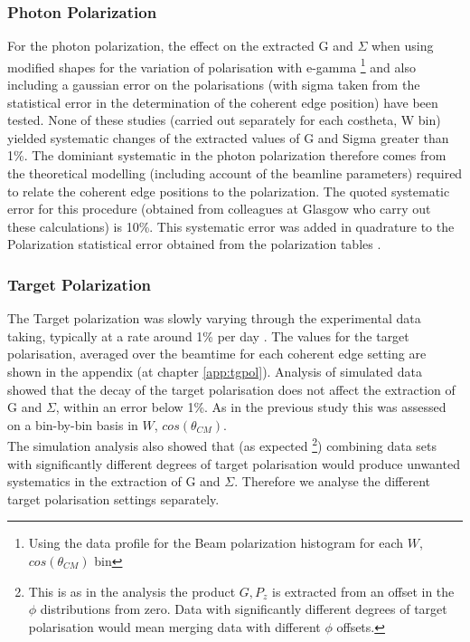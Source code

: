 \subsubsection{Photon Polarization}\label{sec:ph_pol_sys}
For the photon polarization, the effect on the extracted G and $\Sigma$ when using modified shapes for the variation of polarisation with e-gamma \footnote{Using the data profile for the Beam polarization histogram for each $W$, $cos(\theta_{CM})$ bin} and also including a gaussian error on the polarisations (with sigma taken from the statistical error in the determination of the coherent edge position) have been tested. None of these studies (carried out separately for each costheta, W bin) yielded systematic changes of the extracted values of G and Sigma greater than 1\%. The dominiant systematic in the photon polarization therefore comes from the theoretical modelling (including account of the beamline parameters) required to relate the coherent edge positions to the polarization. The quoted systematic error for this procedure (obtained from colleagues at Glasgow who carry out these calculations) is 10\%.
 This systematic error was added in quadrature to the Polarization statistical error obtained from the polarization tables \cite{Anderson_table}.


\subsubsection{Target Polarization}\label{sec:tg_pol_sys}
The Target polarization was slowly varying through the experimental data taking, typically at a rate around 1\% per day \cite{Keith_2012}. The values for the target polarisation, averaged over the beamtime for each coherent edge setting are shown in the appendix (at chapter \ref{app:tgpol}).  Analysis of simulated data showed that the decay of the target polarisation does not affect the extraction of G and $\Sigma$, within an error below 1\%. As in the previous study this was assessed on a bin-by-bin basis in $W$, $cos(\theta_{CM})$. \\
The simulation analysis also showed that (as expected \footnote{This is as in the analysis the product $G,P_z$ is extracted from an offset in the $\phi$ distributions from zero. Data with significantly different degrees of target polarisation would mean merging data with different $\phi$ offsets.}) combining data sets with significantly different degrees of target polarisation would produce unwanted systematics in the extraction of G and $\Sigma$. Therefore we analyse the different target polarisation settings separately. 

